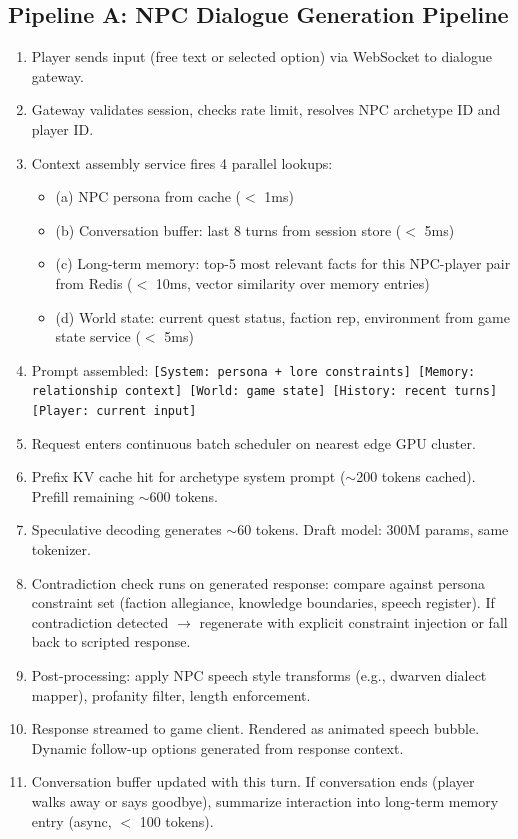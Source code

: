 \subsection*{Pipeline A: NPC Dialogue Generation Pipeline}
\begin{enumerate}
  \item Player sends input (free text or selected option) via WebSocket to dialogue gateway.
  \item Gateway validates session, checks rate limit, resolves NPC archetype ID and player ID.
  \item Context assembly service fires 4 parallel lookups:
  \begin{itemize}
    \item (a) NPC persona from cache ($<$ 1ms)
    \item (b) Conversation buffer: last 8 turns from session store ($<$ 5ms)
    \item (c) Long-term memory: top-5 most relevant facts for this NPC-player pair from Redis ($<$ 10ms, vector similarity over memory entries)
    \item (d) World state: current quest status, faction rep, environment from game state service ($<$ 5ms)
  \end{itemize}
  \item Prompt assembled: \texttt{[System: persona + lore constraints] [Memory: relationship context] [World: game state] [History: recent turns] [Player: current input]}
  \item Request enters continuous batch scheduler on nearest edge GPU cluster.
  \item Prefix KV cache hit for archetype system prompt ($\sim$200 tokens cached). Prefill remaining $\sim$600 tokens.
  \item Speculative decoding generates $\sim$60 tokens. Draft model: 300M params, same tokenizer.
  \item Contradiction check runs on generated response: compare against persona constraint set (faction allegiance, knowledge boundaries, speech register). If contradiction detected $\rightarrow$ regenerate with explicit constraint injection or fall back to scripted response.
  \item Post-processing: apply NPC speech style transforms (e.g., dwarven dialect mapper), profanity filter, length enforcement.
  \item Response streamed to game client. Rendered as animated speech bubble. Dynamic follow-up options generated from response context.
  \item Conversation buffer updated with this turn. If conversation ends (player walks away or says goodbye), summarize interaction into long-term memory entry (async, $<$ 100 tokens).
\end{enumerate}

